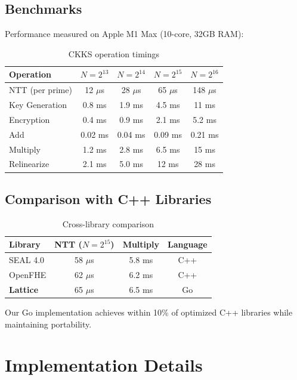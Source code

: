 \documentclass[11pt,a4paper]{article}
\theoremstyle{definition}
\begin{document}
\subsection{Benchmarks}

Performance measured on Apple M1 Max (10-core, 32GB RAM):

\begin{table}[h]
\centering
\begin{tabular}{lcccc}
\toprule
Operation & $N=2^{13}$ & $N=2^{14}$ & $N=2^{15}$ & $N=2^{16}$ \\
\midrule
NTT (per prime) & 12 $\mu$s & 28 $\mu$s & 65 $\mu$s & 148 $\mu$s \\
Key Generation & 0.8 ms & 1.9 ms & 4.5 ms & 11 ms \\
Encryption & 0.4 ms & 0.9 ms & 2.1 ms & 5.2 ms \\
Add & 0.02 ms & 0.04 ms & 0.09 ms & 0.21 ms \\
Multiply & 1.2 ms & 2.8 ms & 6.5 ms & 15 ms \\
Relinearize & 2.1 ms & 5.0 ms & 12 ms & 28 ms \\
\bottomrule
\end{tabular}
\caption{CKKS operation timings}
\end{table}

\subsection{Comparison with C++ Libraries}

\begin{table}[h]
\centering
\begin{tabular}{lccc}
\toprule
Library & NTT ($N=2^{15}$) & Multiply & Language \\
\midrule
SEAL 4.0 & 58 $\mu$s & 5.8 ms & C++ \\
OpenFHE & 62 $\mu$s & 6.2 ms & C++ \\
\textbf{Lattice} & 65 $\mu$s & 6.5 ms & Go \\
\bottomrule
\end{tabular}
\caption{Cross-library comparison}
\end{table}

Our Go implementation achieves within 10\% of optimized C++ libraries while maintaining portability.

\section{Implementation Details}
\end{document}
